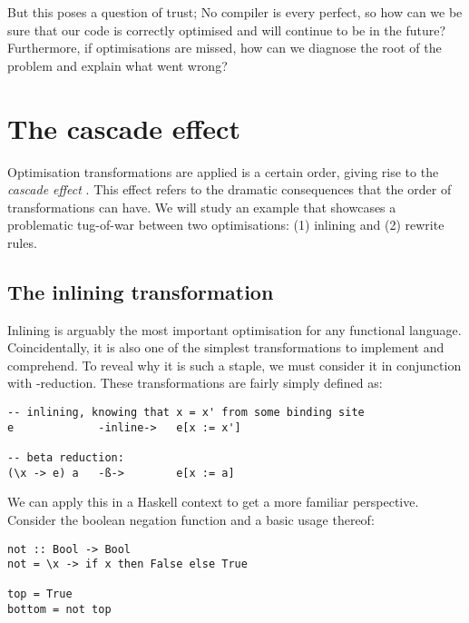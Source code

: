 But this poses a question of trust; No compiler is every perfect, so how can we be sure that our code is
correctly optimised and will continue to be in the future? Furthermore, if optimisations are missed, how
can we diagnose the root of the problem and explain what went wrong?

\section{The cascade effect}

Optimisation transformations are applied is a certain order, giving rise to the \textit{cascade effect} \cite{haskell_optimisations_1997}.
This effect refers to the dramatic consequences that the order of transformations can have. We will study an example that
showcases a problematic tug-of-war between two optimisations: (1) inlining and (2) rewrite rules.

\subsection{The inlining transformation}

Inlining is arguably the most important optimisation for any functional language. Coincidentally,
it is also one of the simplest transformations to implement and comprehend. To reveal
why it is such a staple, we must consider it in conjunction with \textbeta-reduction. 
These transformations are fairly simply defined as:

\begin{listing}[H]
\begin{verbatim}
-- inlining, knowing that x = x' from some binding site
e             -inline->   e[x := x']

-- beta reduction:
(\x -> e) a   -ß->        e[x := a]
\end{verbatim}
\end{listing}

We can apply this in a Haskell context to get a more familiar perspective. 
Consider the boolean negation function  and a basic usage thereof:

\begin{listing}[H]
\begin{verbatim}
not :: Bool -> Bool
not = \x -> if x then False else True

top = True
bottom = not top
\end{verbatim}
\end{listing}

